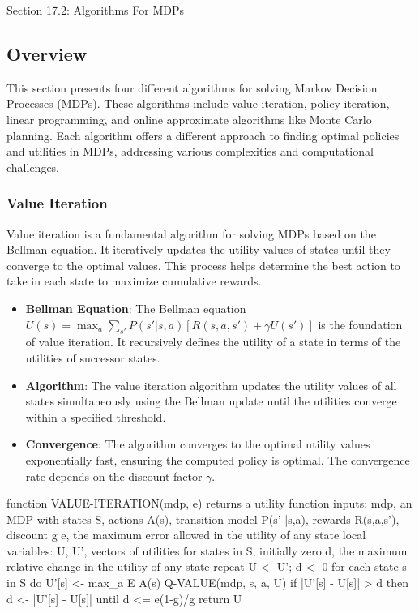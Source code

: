 \begin{notes}{Section 17.2: Algorithms For MDPs}
    \subsection*{Overview}

    This section presents four different algorithms for solving Markov Decision Processes (MDPs). These algorithms include value iteration, policy iteration, linear programming, and online approximate 
    algorithms like Monte Carlo planning. Each algorithm offers a different approach to finding optimal policies and utilities in MDPs, addressing various complexities and computational challenges.
    
    \subsubsection*{Value Iteration}
    
    Value iteration is a fundamental algorithm for solving MDPs based on the Bellman equation. It iteratively updates the utility values of states until they converge to the optimal values. This 
    process helps determine the best action to take in each state to maximize cumulative rewards.
    
    \begin{highlight}
    
        \begin{itemize}
            \item \textbf{Bellman Equation}: The Bellman equation \( U(s) = \max_a \sum_{s'} P(s'|s,a)[R(s,a,s') + \gamma U(s')] \) is the foundation of value iteration. It recursively defines the 
            utility of a state in terms of the utilities of successor states.
            \item \textbf{Algorithm}: The value iteration algorithm updates the utility values of all states simultaneously using the Bellman update until the utilities converge within a specified threshold.
            \item \textbf{Convergence}: The algorithm converges to the optimal utility values exponentially fast, ensuring the computed policy is optimal. The convergence rate depends on the discount factor \(\gamma\).
        \end{itemize}
    
    \begin{code}[Pseudo]
    function VALUE-ITERATION(mdp, e) returns a utility function
        inputs: mdp, an MDP with states S, actions A(s), transition model P(s' |s,a),
                rewards R(s,a,s'), discount g
                e, the maximum error allowed in the utility of any state
        local variables: U, U', vectors of utilities for states in S, initially zero
                        d, the maximum relative change in the utility of any state
        repeat
            U <- U'; d <- 0
            for each state s in S do
                U'[s] <- max_{a E A(s)} Q-VALUE(mdp, s, a, U)
                if |U'[s] - U[s]| > d then d <- |U'[s] - U[s]|
        until d <= e(1-g)/g
        return U
    \end{code}
    \end{highlight}
    

\end{notes}
